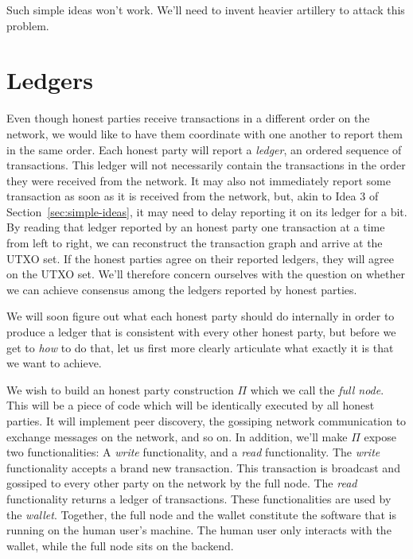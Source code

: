 Such simple ideas won't work. We'll need to invent heavier artillery to attack this
problem.

\section{Ledgers}

Even though honest parties receive transactions in a different order on the network,
we would like to have them coordinate with one another to report them in the same
order. Each honest party will report a \emph{ledger}, an ordered sequence of transactions.
This ledger will not necessarily contain the transactions in the order they were
received from the network. It may also not immediately report some transaction as
soon as it is received from the network, but, akin to Idea 3 of Section~\ref{sec:simple-ideas},
it may need to delay reporting it on its ledger for a bit.
By reading that ledger reported by an honest party one transaction at a time from left to right,
we can reconstruct the transaction graph and arrive at the UTXO set. If the honest parties
agree on their reported ledgers, they will agree on the UTXO set. We'll therefore concern
ourselves with the question on whether we can achieve consensus among the ledgers reported
by honest parties.

We will soon figure out what each honest party should do internally in order to produce
a ledger that is consistent with every other honest party, but before we get to \emph{how}
to do that, let us first more clearly articulate what exactly it is that we want to achieve.

We wish to build an honest party construction $\Pi$ which we call the \emph{full node}.
This will be a piece of code which will be identically executed by all honest parties.
It will implement peer discovery, the
gossiping network communication to exchange messages on the network, and so on. In
addition, we'll make $\Pi$ expose two functionalities: A
\emph{write} functionality, and a \emph{read} functionality. The \emph{write} functionality
accepts a brand new transaction. This transaction is
broadcast and gossiped to every other party on the network by the full node.
The \emph{read} functionality returns a ledger of transactions.
These functionalities are used by the \emph{wallet}. Together, the full node and
the wallet constitute the software that is running on the human user's machine.
The human user only interacts with the wallet, while the full node sits on the backend.

